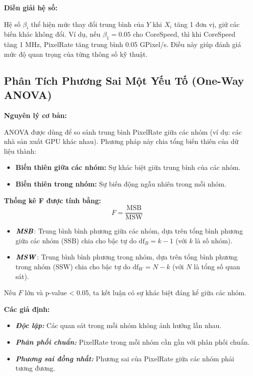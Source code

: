 \textbf{Diễn giải hệ số:}

Hệ số $\beta_i$ thể hiện mức thay đổi trung bình của $Y$ khi $X_i$ tăng 1 đơn vị, giữ các biến khác không đổi. Ví dụ, nếu $\beta_1 = 0.05$ cho CoreSpeed, thì khi CoreSpeed tăng 1 MHz, PixelRate tăng trung bình 0.05 GPixel/s. Điều này giúp đánh giá mức độ quan trọng của từng thông số kỹ thuật.


\subsection{Phân Tích Phương Sai Một Yếu Tố (One-Way ANOVA)}


\textbf{Nguyên lý cơ bản:}

ANOVA được dùng để so sánh trung bình PixelRate giữa các nhóm (ví dụ: các nhà sản xuất GPU khác nhau). Phương pháp này chia tổng biến thiên của dữ liệu thành:

\begin{itemize}
    \item \textbf{Biến thiên giữa các nhóm:} Sự khác biệt giữa trung bình của các nhóm.
    \item \textbf{Biến thiên trong nhóm:} Sự biến động ngẫu nhiên trong mỗi nhóm.
\end{itemize}

\textbf{Thống kê F được tính bằng:}
$$F = \frac{\text{MSB}}{\text{MSW}}$$

\begin{itemize}
    \item $\text{\textbf{\textit{MSB}}}$: Trung bình bình phương giữa các nhóm, dựa trên tổng bình phương giữa các nhóm ($\text{SSB}$) chia cho bậc tự do $\text{df}_B = k - 1$ (với $k$ là số nhóm).
    \item $\text{\textbf{\textit{MSW}}}$: Trung bình bình phương trong nhóm, dựa trên tổng bình phương trong nhóm ($\text{SSW}$) chia cho bậc tự do $\text{df}_W = N - k$ (với $N$ là tổng số quan sát).
\end{itemize}

Nếu $F$ lớn và p-value < 0.05, ta kết luận có sự khác biệt đáng kể giữa các nhóm.


\textbf{Các giả định:}

\begin{itemize}
    \item \textbf{\textit{Độc lập: }}Các quan sát trong mỗi nhóm không ảnh hưởng lẫn nhau.
    \item \textbf{\textit{Phân phối chuẩn:}} PixelRate trong mỗi nhóm cần gần với phân phối chuẩn.
    \item \textbf{\textit{Phương sai đồng nhất:}} Phương sai của PixelRate giữa các nhóm phải tương đương.
\end{itemize}



